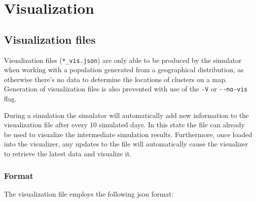 \chapter{Visualization}
\label{chap:visualizer}


\section{Visualization files}
\label{sec:files}

Visualization files (\texttt{*\_vis.json}) are only able to be produced by the simulator when working with a population generated from a geographical distribution, as otherwise there's no data to determine the locations of clusters on a map. Generation of visualization files is also prevented with use of the \texttt{-V} or \texttt{{-}-no-vis} flag.

During a simulation the simulator will automatically add new information to the visualization file after every 10 simulated days. In this state the file can already be used to visualize the intermediate simulation results. Furthermore, once loaded into the visualizer, any updates to the file will automatically cause the visualizer to retrieve the latest data and visualize it.

\subsection{Format}

The visualization file employs the following json format:

